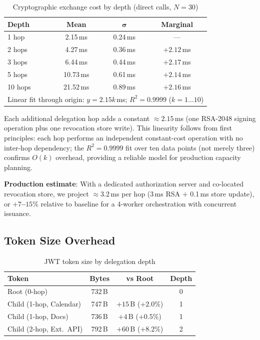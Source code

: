 \documentclass[journal]{IEEEtran}
\begin{document}
\begin{table}[h]
\caption{Cryptographic exchange cost by depth (direct calls, $N=30$)}
\label{tab:hopcosts}
\centering
\footnotesize
\begin{tabular}{lccc}
\toprule
\textbf{Depth} & \textbf{Mean} & $\boldsymbol\sigma$ & \textbf{Marginal} \\
\midrule
1 hop  &  2.15\,ms & 0.24\,ms & ---        \\
2 hops &  4.27\,ms & 0.36\,ms & $+2.12$\,ms \\
3 hops &  6.44\,ms & 0.44\,ms & $+2.17$\,ms \\
5 hops & 10.73\,ms & 0.61\,ms & $+2.14$\,ms \\
10 hops & 21.52\,ms & 0.89\,ms & $+2.16$\,ms \\
\midrule
\multicolumn{4}{l}{\scriptsize
  Linear fit through origin: $y = 2.15k$\,ms;\; $R^2 = 0.9999$ ($k=1\ldots10$)}
\end{tabular}
\end{table}

Each additional delegation hop adds a constant $\approx 2.15$\,ms (one RSA-2048
signing operation plus one revocation store write). This linearity follows from
first principles: each hop performs an independent constant-cost operation with no
inter-hop dependency; the $R^2 = 0.9999$ fit over ten data points (not merely
three) confirms $O(k)$ overhead, providing a reliable model for production
capacity planning.

\textbf{Production estimate}: With a dedicated authorization server and
co-located revocation store, we project $\approx 3.2$\,ms per hop (3\,ms RSA
$+$ 0.1\,ms store update), or \textbf{$+7$--$15\%$} relative to baseline for
a 4-worker orchestration with concurrent issuance.

\subsection{Token Size Overhead}

\begin{table}[h]
\caption{JWT token size by delegation depth}
\label{tab:tokensizes}
\centering
\footnotesize
\begin{tabular}{lccc}
\toprule
\textbf{Token} & \textbf{Bytes} & \textbf{vs Root} & \textbf{Depth} \\
\midrule
Root (0-hop)             & 732\,B &                      & 0 \\
Child (1-hop, Calendar)  & 747\,B & $+15$\,B ($+2.0\%$)   & 1 \\
Child (1-hop, Docs)      & 736\,B & $+4$\,B ($+0.5\%$)    & 1 \\
Child (2-hop, Ext.\ API) & 792\,B & $+60$\,B ($+8.2\%$)   & 2 \\
\bottomrule
\end{tabular}
\end{table}
\end{document}
